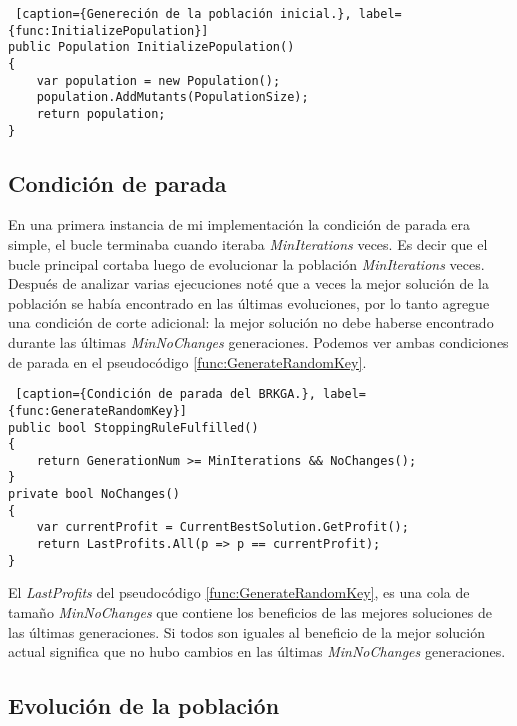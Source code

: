 \begin{minipage}{\linewidth}
\begin{lstlisting} [caption={Genereción de la población inicial.}, label={func:InitializePopulation}]
public Population InitializePopulation()
{ 
	var population = new Population();
	population.AddMutants(PopulationSize);
	return population;
}
\end{lstlisting}
\end{minipage}

\subsection{Condición de parada}

En una primera instancia de mi implementación la condición de parada era simple, el bucle terminaba cuando iteraba \textit{MinIterations} veces. Es decir que el bucle principal cortaba luego de evolucionar la población \textit{MinIterations} veces. Después de analizar varias ejecuciones noté que a veces la mejor solución de la población se había encontrado en las últimas evoluciones, por lo tanto agregue una condición de corte adicional: la mejor solución no debe haberse encontrado durante las últimas \textit{MinNoChanges} generaciones. Podemos ver ambas condiciones de parada en el pseudocódigo \ref{func:GenerateRandomKey}.

\bigskip

\begin{minipage}{\textwidth}
\begin{lstlisting} [caption={Condición de parada del BRKGA.}, label={func:GenerateRandomKey}]
public bool StoppingRuleFulfilled()
{ 
    return GenerationNum >= MinIterations && NoChanges();
}
private bool NoChanges()
{
	var currentProfit = CurrentBestSolution.GetProfit();
	return LastProfits.All(p => p == currentProfit);
}
\end{lstlisting}
\end{minipage}

El \textit{LastProfits} del pseudocódigo \ref{func:GenerateRandomKey}, es una cola de tamaño \textit{MinNoChanges} que contiene los beneficios de las mejores soluciones de las últimas generaciones. Si todos son iguales al beneficio de la mejor solución actual significa que no hubo cambios en las últimas \textit{MinNoChanges} generaciones.

\subsection{Evolución de la población}

